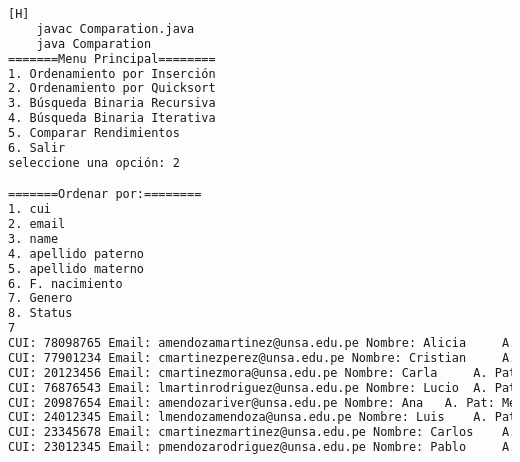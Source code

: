    	\begin{lstlisting}[language=bash,caption={Compilación y ejecución del código}][H]
    javac Comparation.java
    java Comparation
=======Menu Principal========
1. Ordenamiento por Inserción
2. Ordenamiento por Quicksort
3. Búsqueda Binaria Recursiva
4. Búsqueda Binaria Iterativa
5. Comparar Rendimientos
6. Salir
seleccione una opción: 2

=======Ordenar por:========
1. cui
2. email
3. name
4. apellido paterno
5. apellido materno
6. F. nacimiento
7. Genero
8. Status
7
CUI: 78098765 Email: amendozamartinez@unsa.edu.pe Nombre: Alicia	 A. Pat: Mendoza A. Mat: Martinez Fecha de Nacimiento: 1991-08-07 Genero: 0 Estado: 1
CUI: 77901234 Email: cmartinezperez@unsa.edu.pe Nombre: Cristian	 A. Pat: Martinez A. Mat: Perez Fecha de Nacimiento: 1997-06-24 Genero: 0 Estado: 1
CUI: 20123456 Email: cmartinezmora@unsa.edu.pe Nombre: Carla	 A. Pat: Martinez A. Mat: Mora Fecha de Nacimiento: 1998-04-12 Genero: 0 Estado: 1
CUI: 76876543 Email: lmartinrodriguez@unsa.edu.pe Nombre: Lucio	 A. Pat: Martin A. Mat: Rodriguez Fecha de Nacimiento: 1994-04-11 Genero: 0 Estado: 1
CUI: 20987654 Email: amendozariver@unsa.edu.pe Nombre: Ana	 A. Pat: Mendoza A. Mat: Rivera Fecha de Nacimiento: 1997-03-25 Genero: 0 Estado: 1
CUI: 24012345 Email: lmendozamendoza@unsa.edu.pe Nombre: Luis	 A. Pat: Mendoza A. Mat: Mendoza Fecha de Nacimiento: 1987-01-09 Genero: 1 Estado: 0
CUI: 23345678 Email: cmartinezmartinez@unsa.edu.pe Nombre: Carlos	 A. Pat: Martinez A. Mat: Martinez Fecha de Nacimiento: 1996-11-25 Genero: 1 Estado: 1
CUI: 23012345 Email: pmendozarodriguez@unsa.edu.pe Nombre: Pablo	 A. Pat: Mendoza A. Mat: Rodriguez Fecha de Nacimiento: 1993-08-14 Genero: 1 Estado: 1

  \end{lstlisting}

